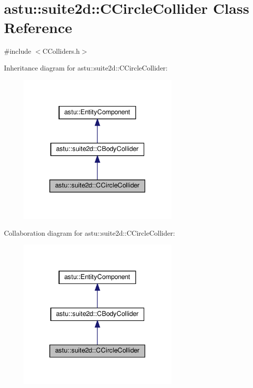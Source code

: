 \hypertarget{classastu_1_1suite2d_1_1CCircleCollider}{}\section{astu\+:\+:suite2d\+:\+:C\+Circle\+Collider Class Reference}
\label{classastu_1_1suite2d_1_1CCircleCollider}


{\ttfamily \#include $<$C\+Colliders.\+h$>$}



Inheritance diagram for astu\+:\+:suite2d\+:\+:C\+Circle\+Collider\+:\nopagebreak
\begin{figure}[H]
\begin{center}
\leavevmode
\includegraphics[width=225pt]{classastu_1_1suite2d_1_1CCircleCollider__inherit__graph}
\end{center}
\end{figure}


Collaboration diagram for astu\+:\+:suite2d\+:\+:C\+Circle\+Collider\+:\nopagebreak
\begin{figure}[H]
\begin{center}
\leavevmode
\includegraphics[width=225pt]{classastu_1_1suite2d_1_1CCircleCollider__coll__graph}
\end{center}
\end{figure}
